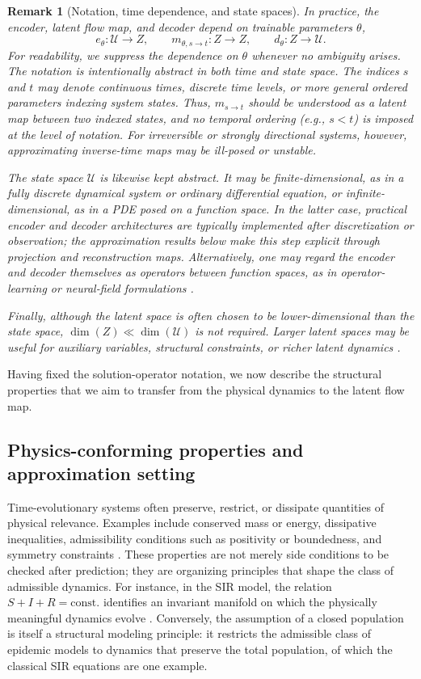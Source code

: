 \documentclass[a4paper,fleqn]{cas-sc}
\theoremstyle{thmstyleone}%
\theoremstyle{thmstyletwo}%
\newtheorem{remark}{Remark}%
\theoremstyle{thmstylethree}%
\begin{document}
\begin{remark}[Notation, time dependence, and state spaces]
In practice, the encoder, latent flow map, and decoder depend on trainable parameters $\theta$,
$$
e_\theta:\mathcal U\to Z,\qquad
m_{\theta,s\to t}:Z\to Z,\qquad
d_\theta:Z\to\mathcal U.
$$
For readability, we suppress the dependence on $\theta$ whenever no ambiguity arises. The notation is intentionally abstract in both time and state space. The indices $s$ and $t$ may denote continuous times, discrete time levels, or more general ordered parameters indexing system states. Thus, $m_{s\to t}$ should be understood as a latent map between two indexed states, and no temporal ordering (e.g., $s<t$) is imposed at the level of notation. For irreversible or strongly directional systems, however, approximating inverse-time maps may be ill-posed or unstable.

The state space $\mathcal U$ is likewise kept abstract. It may be finite-dimensional, as in a fully discrete dynamical system or ordinary differential equation, or infinite-dimensional, as in a PDE posed on a function space. In the latter case, practical encoder and decoder architectures are typically implemented after discretization or observation; the approximation results below make this step explicit through projection and reconstruction maps. Alternatively, one may regard the encoder and decoder themselves as operators between function spaces, as in operator-learning or neural-field formulations \cite{lu2021learning,li2020fourier,sitzmann2020implicit}.

Finally, although the latent space is often chosen to be lower-dimensional than the state space, $\dim(Z)\ll \dim(\mathcal U)$ is not required. Larger latent spaces may be useful for auxiliary variables, structural constraints, or richer latent dynamics \cite{chung2025sparse}.
\end{remark}

Having fixed the solution-operator notation, we now describe the structural properties that we aim to transfer from the physical dynamics to the latent flow map.

\subsection{Physics-conforming properties and approximation setting} \label{sec:physicsconf}
Time-evolutionary systems often preserve, restrict, or dissipate quantities of physical relevance. Examples include conserved mass or energy, dissipative inequalities, admissibility conditions such as positivity or boundedness, and symmetry constraints \cite{murray2007mathematical,Khalil2002,HairerWanner1996}. These properties are not merely side conditions to be checked after prediction; they are organizing principles that shape the class of admissible dynamics. For instance, in the SIR model, the relation $S+I+R=\mathrm{const.}$ identifies an invariant manifold on which the physically meaningful dynamics evolve \cite{murray2007mathematical}. Conversely, the assumption of a closed population is itself a structural modeling principle: it restricts the admissible class of epidemic models to dynamics that preserve the total population, of which the classical SIR equations are one example.
\end{document}
